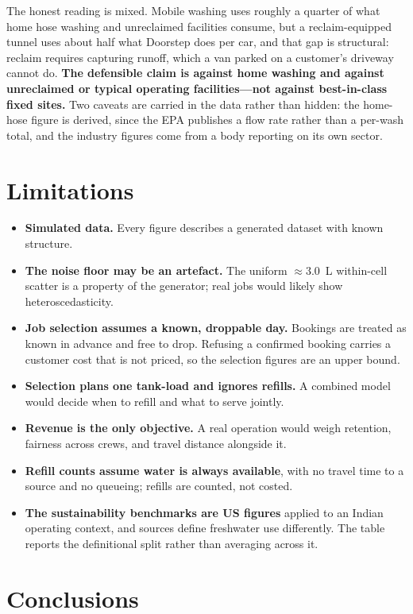\documentclass[conference]{IEEEtran}
\begin{document}
The honest reading is mixed. Mobile washing uses roughly a quarter of what home hose washing and
unreclaimed facilities consume, but a reclaim-equipped tunnel uses about half what Doorstep does
per car, and that gap is structural: reclaim requires capturing runoff, which a van parked on a
customer's driveway cannot do. \textbf{The defensible claim is against home washing and against
unreclaimed or typical operating facilities---not against best-in-class fixed sites.} Two
caveats are carried in the data rather than hidden: the home-hose figure is derived, since the
EPA publishes a flow rate rather than a per-wash total, and the industry figures come from a
body reporting on its own sector.

\section{Limitations}

\begin{itemize}
\item \textbf{Simulated data.} Every figure describes a generated dataset with known structure.
\item \textbf{The noise floor may be an artefact.} The uniform $\approx 3.0$~L within-cell
scatter is a property of the generator; real jobs would likely show heteroscedasticity.
\item \textbf{Job selection assumes a known, droppable day.} Bookings are treated as known in
advance and free to drop. Refusing a confirmed booking carries a customer cost that is not
priced, so the selection figures are an upper bound.
\item \textbf{Selection plans one tank-load and ignores refills.} A combined model would decide
when to refill and what to serve jointly.
\item \textbf{Revenue is the only objective.} A real operation would weigh retention, fairness
across crews, and travel distance alongside it.
\item \textbf{Refill counts assume water is always available}, with no travel time to a source
and no queueing; refills are counted, not costed.
\item \textbf{The sustainability benchmarks are US figures} applied to an Indian operating
context, and sources define freshwater use differently. The table reports the definitional split
rather than averaging across it.
\end{itemize}

\section{Conclusions}
\end{document}
